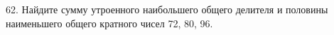 62. Найдите сумму утроенного наибольшего общего делителя и половины наименьшего общего кратного чисел 72, 80, 96.\\
